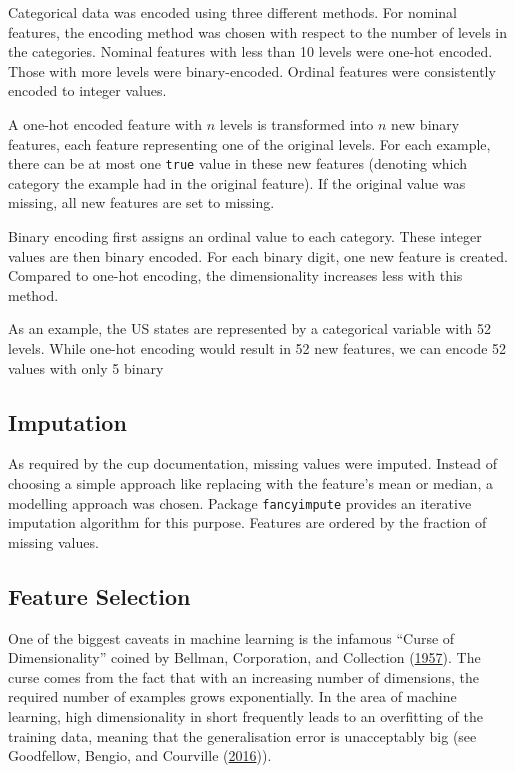 \documentclass[
  11pt,
  a4paper,
  DIV=12,captions=tableheading,oneside]{scrbook}
\begin{document}
Categorical data was encoded using three different methods. For nominal features, the encoding method was chosen with respect to the number of levels in the categories. Nominal features with less than 10 levels were one-hot encoded. Those with more levels were binary-encoded. Ordinal features were consistently encoded to integer values.

A one-hot encoded feature with \(n\) levels is transformed into \(n\) new binary features, each feature representing one of the original levels. For each example, there can be at most one \texttt{true} value in these new features (denoting which category the example had in the original feature). If the original value was missing, all new features are set to missing.

Binary encoding first assigns an ordinal value to each category. These integer values are then binary encoded. For each binary digit, one new feature is created. Compared to one-hot encoding, the dimensionality increases less with this method.

As an example, the US states are represented by a categorical variable with 52 levels. While one-hot encoding would result in 52 new features, we can encode 52 values with only 5 binary

\hypertarget{imputation}{%
\subsection{Imputation}\label{imputation}}

As required by the cup documentation, missing values were imputed. Instead of choosing a simple approach like replacing with the feature's mean or median, a modelling approach was chosen. Package \texttt{fancyimpute} provides an iterative imputation algorithm for this purpose. Features are ordered by the fraction of missing values.

\hypertarget{feature-selection}{%
\subsection{Feature Selection}\label{feature-selection}}

One of the biggest caveats in machine learning is the infamous ``Curse of Dimensionality'' coined by Bellman, Corporation, and Collection (\protect\hyperlink{ref-bellman1957dynamic}{1957}). The curse comes from the fact that with an increasing number of dimensions, the required number of examples grows exponentially. In the area of machine learning, high dimensionality in short frequently leads to an overfitting of the training data, meaning that the generalisation error is unacceptably big (see Goodfellow, Bengio, and Courville (\protect\hyperlink{ref-Goodfellow-et-al-2016}{2016})).
\end{document}
